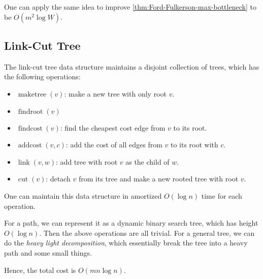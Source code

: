 \begin{remark}
	One can apply the same idea to improve \autoref{thm:Ford-Fulkerson-max-bottleneck} to be \(O(m^2 \log W)\).
\end{remark}

\subsection{Link-Cut Tree}
\begin{definition}\label{def:link-cut-tree}

\end{definition}
The link-cut tree data structure maintains a disjoint collection of trees, which has the following operations:
\begin{itemize}
	\item \(\operatorname{maketree}(v) \): make a new tree with only root \(v\).
	\item \(\operatorname{findroot}(v) \)
	\item \(\operatorname{findcost}(v) \): find the cheapest cost edge from \(v\) to its root.
	\item \(\operatorname{addcost}(v, c) \): add the cost of all edges from \(v\) to its root with \(c\).
	\item \(\operatorname{link}(v, w) \): add tree with root \(v\) as the child of \(w\).
	\item \(\operatorname{cut}(v) \): detach \(v\) from its tree and make a new rooted tree with root \(v\).
\end{itemize}

One can maintain this data structure in amortized \(O(\log n)\) time for each operation.

\begin{intuition}
	For a path, we can represent it as a dynamic binary search tree, which has height \(O(\log n)\). Then the above operations are all trivial. For a general tree, we can do the \emph{heavy light decomposition}, which essentially break the tree into a heavy path and some small things.
\end{intuition}

Hence, the total cost is \(O(m n \log n)\).